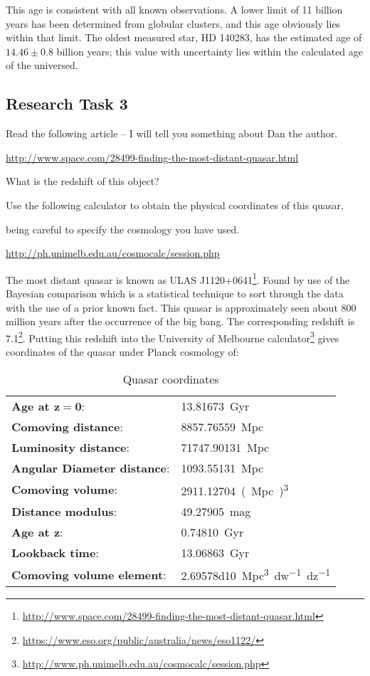 \documentclass[a4paper]{article} %
\begin{document}
This age is consistent with all known observations. A lower limit of 11 billion years has been determined from globular clusters, and this age obviously lies within that limit. The oldest measured star, HD 140283, has the estimated age of  $14.46 \pm 0.8$ billion years; this value with uncertainty lies within the calculated age of the universed.




\subsection{Research Task 3}
\begin{framed}
Read the following article – I will tell you something about Dan the author.

\url{http://www.space.com/28499-finding-the-most-distant-quasar.html}

What is the redshift of this object?

Use the following calculator to obtain the physical coordinates of this quasar,

being careful to specify the cosmology you have used.

\url{http://ph.unimelb.edu.au/cosmocalc/session.php}
\end{framed}

The most distant quasar is known as ULAS J1120+0641\footnote{\url{http://www.space.com/28499-finding-the-most-distant-quasar.html}}. Found by use of the Bayesian comparison which is a statistical technique to sort through the data with the use of a prior known fact. This quasar is approximately seen about 800 million years after the occurrence of the big bang. The corresponding redshift is 7.1\footnote{\url{https://www.eso.org/public/australia/news/eso1122/}}.
Putting this redshift into the University of Melbourne calculator\footnote{\url{http://www.ph.unimelb.edu.au/cosmocalc/session.php}} gives coordinates of the quasar under Planck cosmology of:


\begin{table}[h]
\centering
\begin{tabular}{ll}
\textbf{Age at $\bm{z=0}$}:&\SI{13.81673}{Gyr}\\
\textbf{Comoving distance}:&\SI{8857.76559}{Mpc}\\
\textbf{Luminosity distance}:&\SI{71747.90131}{Mpc}\\
\textbf{Angular Diameter distance}:&\SI{1093.55131}{Mpc}\\
\textbf{Comoving volume}:&\SI{2911.12704}{(Mpc)^3}\\
\textbf{Distance modulus}:&\SI{49.27905}{mag}\\
\textbf{Age at $\bm{z}$}:&\SI{0.74810}{Gyr}\\
\textbf{Lookback time}:&\SI{13.06863}{Gyr}\\
\textbf{Comoving volume element}:&\SI{2.69578d10}{Mpc^3 dw^{-1} dz^{-1}}	
\end{tabular}
\caption{Quasar coordinates}
\end{table}
\end{document}
